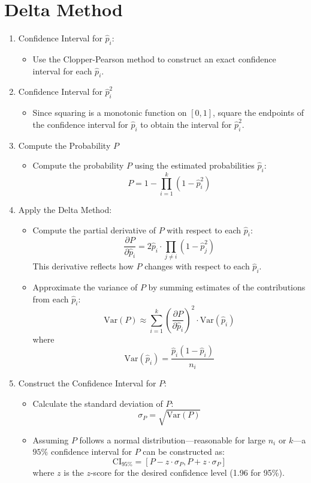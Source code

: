 \documentclass{article}
\begin{document}
\section*{Delta Method}
\begin{enumerate}
    \item Confidence Interval for \( \hat p_i \):
\begin{itemize}
    \item Use the Clopper-Pearson method to construct an exact confidence interval for each \( \hat{p}_i \).
\end{itemize}

\item Confidence Interval for \( \hat p_i^2 \)
\begin{itemize}
    \item Since squaring is a monotonic function on  \( \left[ 0, 1 \right] \), %
    square the endpoints of the confidence interval for \( \hat p_i \) to obtain the interval for \( \hat p_i^2 \).
\end{itemize}

\item Compute the Probability \( P \)
\begin{itemize}
    \item Compute the probability \( P \) using the estimated probabilities \( \hat{p}_i \):
\[
P = 1 - \prod_{i=1}^{k} (1 - \hat{p}_i^2)
\]
\end{itemize}

\item Apply the Delta Method:
\begin{itemize}
\item Compute the partial derivative of \( P \) with respect to each \( \hat{p}_i \):
\[
\frac{\partial P}{\partial \hat{p}_i} = 2 \hat{p}_i \cdot \prod_{j \neq i} (1 - \hat{p}_j^2)
\]
This derivative reflects how \( P \) changes with respect to each \( \hat{p}_i \).

\item Approximate the variance of \( P \) by summing estimates of the contributions from each \( \hat{p}_i \):
\[
\text{Var}(P) \approx \sum_{i=1}^{k} \left(\frac{\partial P}{\partial \hat{p}_i}\right)^2 \cdot \text{Var}(\hat{p}_i)
\]
where
\[
\text{Var}(\hat{p}_i) = \frac{\hat{p}_i(1 - \hat{p}_i)}{n_i}
\]
\end{itemize}

\item Construct the Confidence Interval for \( P \):
\begin{itemize}

\item Calculate the standard deviation of $ P $:
\[
\sigma_P = \sqrt{\text{Var}(P)}
\]

\item Assuming \( P \) follows a normal distribution---reasonable for large \( n_i \) or \( k \)---a \( 95\% \) confidence interval for \( P \) can be constructed as:
\[
    \text{CI}_{95\%} = \left[ P - z \cdot \sigma_P, P + z \cdot \sigma_P \right]
\]
where \(z \) is the $z$-score for the desired confidence level (1.96 for 95\%).
\end{itemize}

\end{enumerate}
\end{document}
